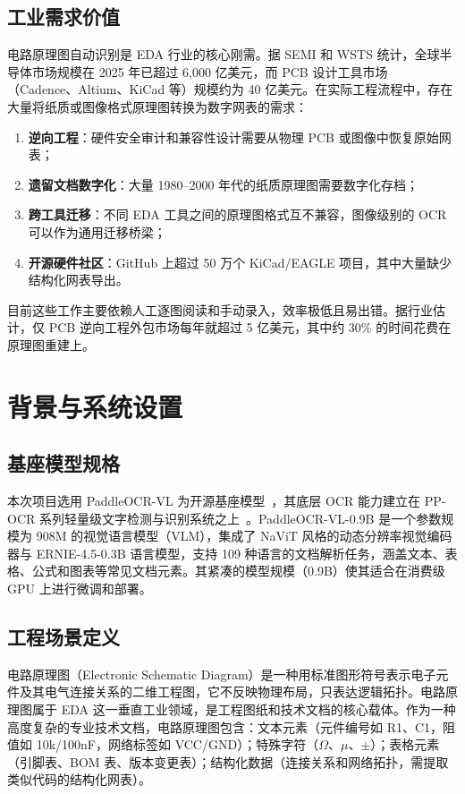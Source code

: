 \subsection{工业需求价值}

电路原理图自动识别是 EDA 行业的核心刚需。据 SEMI 和 WSTS 统计，全球半导体市场规模在 2025 年已超过 6,000 亿美元，而 PCB 设计工具市场（Cadence、Altium、KiCad 等）规模约为 40 亿美元。在实际工程流程中，存在大量将纸质或图像格式原理图转换为数字网表的需求：

\begin{enumerate}[nosep]
    \item \textbf{逆向工程}：硬件安全审计和兼容性设计需要从物理 PCB 或图像中恢复原始网表；
    \item \textbf{遗留文档数字化}：大量 1980--2000 年代的纸质原理图需要数字化存档；
    \item \textbf{跨工具迁移}：不同 EDA 工具之间的原理图格式互不兼容，图像级别的 OCR 可以作为通用迁移桥梁；
    \item \textbf{开源硬件社区}：GitHub 上超过 50 万个 KiCad/EAGLE 项目，其中大量缺少结构化网表导出。
\end{enumerate}

目前这些工作主要依赖人工逐图阅读和手动录入，效率极低且易出错。据行业估计，仅 PCB 逆向工程外包市场每年就超过 5 亿美元，其中约 30\% 的时间花费在原理图重建上。


\section{背景与系统设置}
\label{sec:headings}

\subsection{基座模型规格}

本次项目选用 PaddleOCR-VL 为开源基座模型~\citep{cui2025paddleocrvl}，其底层 OCR 能力建立在 PP-OCR 系列轻量级文字检测与识别系统之上~\citep{li2022ppocrv3}。PaddleOCR-VL-0.9B 是一个参数规模为 908M 的视觉语言模型（VLM），集成了 NaViT 风格的动态分辨率视觉编码器与 ERNIE-4.5-0.3B 语言模型，支持 109 种语言的文档解析任务，涵盖文本、表格、公式和图表等常见文档元素。其紧凑的模型规模（0.9B）使其适合在消费级 GPU 上进行微调和部署。

\subsection{工程场景定义}

电路原理图（Electronic Schematic Diagram）是一种用标准图形符号表示电子元件及其电气连接关系的二维工程图，它不反映物理布局，只表达逻辑拓扑。电路原理图属于 EDA 这一垂直工业领域，是工程图纸和技术文档的核心载体。作为一种高度复杂的专业技术文档，电路原理图包含：文本元素（元件编号如 R1、C1，阻值如 10k/100nF，网络标签如 VCC/GND）；特殊字符（$\Omega$、$\mu$、$\pm$）；表格元素（引脚表、BOM 表、版本变更表）；结构化数据（连接关系和网络拓扑，需提取类似代码的结构化网表）。

